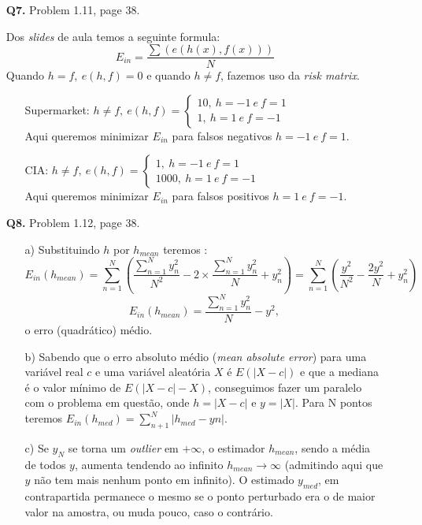 \documentclass[12pt]{article}
\begin{document}
\begin{enumerate}
\pagebreak

\item [\textbf{Q7.}] Problem 1.11, page 38.
	\begin{addmargin}[1em]{2em}%
		Dos \textit{slides} de aula temos a seguinte formula: \[E_{in} = \frac{\sum( e( h(x) , f(x) ) )}{N}\]
		Quando $h = f,\ e(h,f) = 0$ e quando $h \neq f$, fazemos uso da \textit{risk matrix}.
		\begin{itemize}
			\item[Supermarket:] $h \neq f,\ e(h,f) = \left\{\begin{array}{l}10,\ h = -1\ e\ f = 1\\1,\ h = 1\ e\ f = -1\end{array}\right.$\\
			Aqui queremos minimizar $E_{in}$ para falsos negativos $h = -1\ e\ f = 1$.
			\item[CIA:] $h \neq f,\ e(h,f) = \left\{\begin{array}{l}1,\ h = -1\ e\ f = 1\\1000,\ h = 1\ e\ f = -1\end{array}\right.$\\
			Aqui queremos minimizar $E_{in}$ para falsos positivos $h = 1\ e\ f = -1$.
		\end{itemize}
	\end{addmargin}

\item [\textbf{Q8.}] Problem 1.12, page 38.
	\begin{addmargin}[1em]{2em}
		\begin{itemize}
			\item[a)] Substituindo $h$ por $h_{mean}$ teremos : \[E_{in}(h_{mean}) = \sum_{n=1}^{N}(\frac{\sum_{n=1}^{N}y_n^2}{N^2} - 2 \times \frac{\sum_{n=1}^{N}y_n^2}{N} + y_n^2) = \sum_{n=1}^{N}(\frac{y^2}{N^2} - \frac{2y^2}{N} + y_n^2)\] \[ E_{in}(h_{mean}) = \frac{\sum_{n=1}^{N}y_n^2}{N} - y^2,\]
			o erro (quadrático) médio. 
			\item[b)] Sabendo que o erro absoluto médio (\textit{mean absolute error}) para uma variável real $c$ e uma variável aleatória $X$ é $E(|X - c|)$ e que a mediana é o valor mínimo de $E(|X-c| - X)$, conseguimos fazer um paralelo com o problema em questão, onde $h=|X-c|$ e $y = |X|$. Para N pontos teremos $E_{in}(h_{med}) = \sum_{n+1}^{N}|h_{med} - yn|$.
			\item[c)] Se $y_N$ se torna um \textit{outlier} em $+ \infty$, o estimador $h_{mean}$, sendo a média de todos $y$, aumenta tendendo ao infinito $h_{mean} \rightarrow \infty$ (admitindo aqui que $y$ não tem mais nenhum ponto em infinito). O estimado $y_{med}$, em contrapartida permanece o mesmo se o ponto perturbado era o de maior valor na amostra, ou muda pouco, caso o contrário.
		\end{itemize}
	\end{addmargin}


\end{enumerate}
\end{document}
